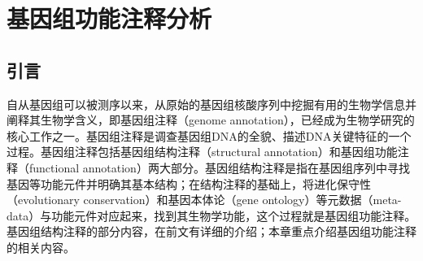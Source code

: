 \documentclass[11pt,a4paper,twoside]{book}
\begin{document}
\setcounter{chapter}{4}
\chapter{基因组功能注释分析}
\noindent
{}

\section{引言}
自从基因组可以被测序以来，从原始的基因组核酸序列中挖掘有用的生物学信息并阐释其生物学含义，即基因组注释（genome annotation），已经成为生物学研究的核心工作之一。基因组注释是调查基因组DNA的全貌、描述DNA关键特征的一个过程。基因组注释包括基因组结构注释（structural annotation）和基因组功能注释（functional annotation）两大部分。基因组结构注释是指在基因组序列中寻找基因等功能元件并明确其基本结构；在结构注释的基础上，将进化保守性（evolutionary conservation）和基因本体论（gene ontology）等元数据（meta-data）与功能元件对应起来，找到其生物学功能，这个过程就是基因组功能注释。基因组结构注释的部分内容，在前文有详细的介绍；本章重点介绍基因组功能注释的相关内容。
\end{document}
